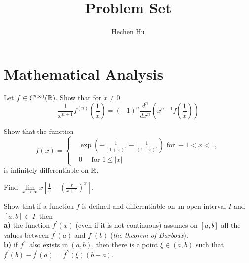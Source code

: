 \documentclass{article}
\newenvironment{problem}[2][Problem]{\begin{trivlist}
		\item[\hskip \labelsep {\bfseries #1}\hskip \labelsep {\bfseries #2.}]}{\end{trivlist}}
\begin{document}
	
	\title{Problem Set}
	\author{Hechen Hu}
	\maketitle
	
	\section{Mathematical Analysis}
	\begin{problem}{1}
		Let $ f \in C^{(\infty)}(\mathbb{R}) $. Show that for $ x \neq 0 $
		\begin{equation}
			\frac{1}{x^{n+1}}f^{(n)}(\frac{1}{x}) = (-1)^n \frac{d^n}{d x^n}(x^{n-1} f (\frac{1}{x})) \nonumber
		\end{equation}
	\end{problem}
\begin{problem}{2}
	Show that the function
	\begin{equation}
		f(x)=\begin{cases}
		&\exp(-\frac{1}{(1+x)^2}-\frac{1}{(1-x)^2}) \text{ for }-1<x<1,\\
		&0\quad \text{ for }1 \leqslant |x|
		\end{cases}\nonumber
	\end{equation}
	is infinitely differentiable on $ \mathbb{R} $.
\end{problem}
\begin{problem}{3}
	Find $ \lim\limits_{x \to \infty} x[\frac{1}{e}-(\frac{x}{x+1})^x] $.
\end{problem}
\begin{problem}{4}
	Show that if a function $ f $ is defined and differentiable on an open interval $ I $ and $ [a,b]\subset I $, then\\
	\textbf{a)} the function $ f^\prime(x) $ (even if it is not continuous) assumes on $ [a,b] $ all the values between $ f^\prime(a) $ and $ f^\prime (b) $ (\textit{the theorem of Darboux}). \\
	\textbf{b)} if $ f^{\prime\prime} $ also exists in $ (a,b) $, then there is a point $ \xi \in (a,b) $ such that $ f^{\prime}(b)-f^\prime (a)=f^{\prime\prime}(\xi)(b-a) $.
\end{problem}
\end{document}
